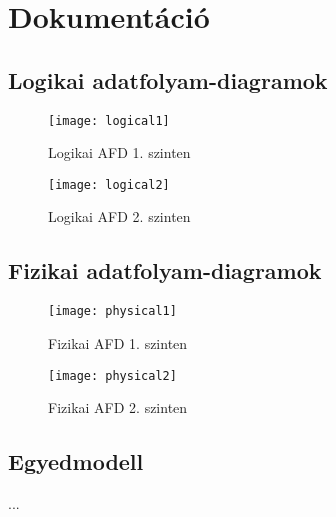 \section{Dokumentáció}\label{sec:dokumentacio}

\subsection{Logikai adatfolyam-diagramok}

\begin{figure}[!htb]

    \centering
    \texttt{[image: logical1]}
    \caption{\label{fig:logical1}Logikai AFD 1. szinten}

\end{figure}

\begin{figure}[!htb]

    \centering
    \texttt{[image: logical2]}
    \caption{\label{fig:logical2}Logikai AFD 2. szinten}

\end{figure}

\subsection{Fizikai adatfolyam-diagramok}

\begin{figure}[!htb]

    \centering
    \texttt{[image: physical1]}
    \caption{\label{fig:physical1}Fizikai AFD 1. szinten}

\end{figure}

\begin{figure}[!htb]

    \centering
    \texttt{[image: physical2]}
    \caption{\label{fig:physical2}Fizikai AFD 2. szinten}

\end{figure}

\subsection{Egyedmodell}
...
